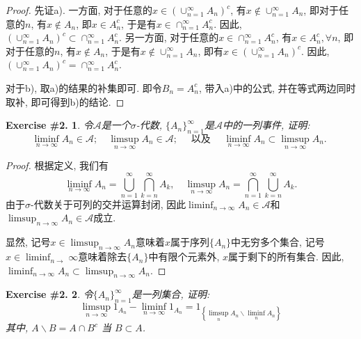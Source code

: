 \documentclass[UTF8, a4paper]{article}
\newtheorem{exercise}{Exercise \#2.}
\begin{document}
\begin{proof}
先证a). 一方面, 对于任意的\(x \in \left(\cup_{n=1}^{\infty} A_n\right)^c\), 有\(x \notin \cup_{n=1}^{\infty} A_n\), 即对于任意的\(n\), 有\(x \notin A_n\), 即\(x \in A_n^c\), 于是有\(x \in \cap_{n=1}^{\infty} A_n^c\). 
因此, \(\left(\cup_{n=1}^{\infty} A_n\right)^c  \subset \cap_{n=1}^{\infty} A_n^c\).
另一方面, 对于任意的\(x \in \cap_{n=1}^{\infty} A_n^c\), 有\(x \in A_n^c, \forall n\), 即对于任意的\(n\), 有\(x \notin A_n\), 于是有\(x \notin \cup_{n=1}^{\infty} A_n\), 即有\(x \in \left(\cup_{n=1}^{\infty} A_n\right)^c\). 因此, \(\left(\cup_{n=1}^{\infty} A_n\right)^c  =\cap_{n=1}^{\infty} A_n^c\).

对于b), 取a)的结果的补集即可. 即令\(B_n = A_n^c\), 带入a)中的公式, 并在等式两边同时取补, 即可得到b)的结论.
\end{proof}


\begin{framed}
\begin{exercise}
令\(\mathcal{A}\)是一个\(\sigma\)-代数, \(\{A_n\}_{n = 1}^\infty\)是\(\mathcal{A}\)中的一列事件, 证明:
$$
\liminf _{n \rightarrow \infty} A_n \in \mathcal{A} ; \quad \limsup _{n \rightarrow \infty} A_n \in \mathcal{A} ; \quad \text { 以及 } \quad \liminf _{n \rightarrow \infty} A_n \subset \limsup _{n \rightarrow \infty} A_n \text {. }
$$
\end{exercise}
\end{framed}

\begin{proof}
根据定义, 我们有
$$
\liminf_{n \rightarrow \infty} A_n = \bigcup_{n=1}^{\infty} \bigcap_{k=n}^{\infty} A_k, \quad \limsup_{n \rightarrow \infty} A_n = \bigcap_{n=1}^{\infty} \bigcup_{k=n}^{\infty} A_k.
$$
由于\(\sigma\)-代数关于可列的交并运算封闭, 因此\(\liminf_{n \rightarrow \infty} A_n \in \mathcal{A}\)和\(\limsup_{n \rightarrow \infty} A_n \in \mathcal{A}\)成立.

显然, 记号\(x \in \limsup_{n\rightarrow \infty} A_n\)意味着\(x\)属于序列\(\{A_n\}\)中无穷多个集合, 记号\(x\in \liminf_{n\rightarrow} \infty\)意味着除去\(\{A_n\}\)中有限个元素外, \(x\)属于剩下的所有集合. 因此, \(\liminf_{n \rightarrow \infty} A_n \subset \limsup_{n \rightarrow \infty} A_n\).
\end{proof}

\begin{framed}
\begin{exercise}
令\(\{A_n\}_{n = 1}^\infty\)是一列集合, 证明:
$$
\limsup _{n \rightarrow \infty} 1_{A_n}-\liminf _{n \rightarrow \infty} 1_{A_n}=1_{\left\{\limsup _n A_n \backslash \liminf _n A_n\right\}}
$$
其中, $A \backslash B=A \cap B^c$ 当 $B \subset A$.
\end{exercise}
\end{framed}
\end{document}
